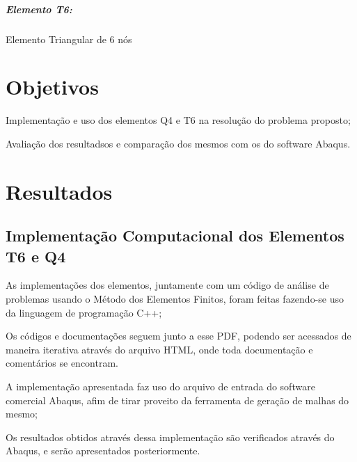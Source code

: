 \subparagraph*{Elemento T6\+:}


\begin{DoxyItemize}
\item Elemento Triangular de 6 nós
\end{DoxyItemize}

\subsection*{}

\section*{Objetivos}


\begin{DoxyItemize}
\item Implementação e uso dos elementos Q4 e T6 na resolução do problema proposto;
\item Avaliação dos resultadsos e comparação dos mesmos com os do software Abaqus.
\end{DoxyItemize}

\section*{Resultados}

\subsection*{Implementação Computacional dos Elementos T6 e Q4}


\begin{DoxyItemize}
\item As implementações dos elementos, juntamente com um código de análise de problemas usando o Método dos Elementos Finitos, foram feitas fazendo-\/se uso da linguagem de programação C++;
\item Os códigos e documentações seguem junto a esse P\+DF, podendo ser acessados de maneira iterativa através do arquivo H\+T\+ML, onde toda documentação e comentários se encontram.
\item A implementação apresentada faz uso do arquivo de entrada do software comercial Abaqus, afim de tirar proveito da ferramenta de geração de malhas do mesmo;
\item Os resultados obtidos através dessa implementação são verificados através do Abaqus, e serão apresentados posteriormente.
\end{DoxyItemize}

